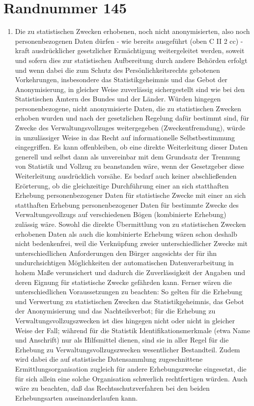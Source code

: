     \section{Randnummer 145}
        \begin{enumerate}[label=\arabic*,start=145]
            \item Die zu statistischen Zwecken erhobenen, noch nicht anonymisierten, also noch personenbezogenen Daten dürfen - wie bereits ausgeführt (oben C II 2 cc) - kraft ausdrücklicher gesetzlicher Ermächtigung weitergeleitet werden, soweit und sofern dies zur statistischen Aufbereitung durch andere Behörden erfolgt und wenn dabei die zum Schutz des Persönlichkeitsrechts gebotenen Vorkehrungen, insbesondere das Statistikgeheimnis und das Gebot der Anonymisierung, in gleicher Weise zuverlässig sichergestellt sind wie bei den Statistischen Ämtern des Bundes und der Länder. Würden hingegen personenbezogene, nicht anonymisierte Daten, die zu statistischen Zwecken erhoben wurden und nach der gesetzlichen Regelung dafür bestimmt sind, für Zwecke des Verwaltungsvollzuges weitergegeben (Zweckentfremdung), würde in unzulässiger Weise in das Recht auf informationelle Selbstbestimmung eingegriffen. Es kann offenbleiben, ob eine direkte Weiterleitung dieser Daten generell und selbst dann als unvereinbar mit dem Grundsatz der Trennung von Statistik und Vollzug zu beanstanden wäre, wenn der Gesetzgeber diese Weiterleitung ausdrücklich vorsähe. Es bedarf auch keiner abschließenden Erörterung, ob die gleichzeitige Durchführung einer an sich statthaften Erhebung personenbezogener Daten für statistische Zwecke mit einer an sich statthaften Erhebung personenbezogener Daten für bestimmte Zwecke des Verwaltungsvollzugs auf verschiedenen Bögen (kombinierte Erhebung) zulässig wäre. Sowohl die direkte Übermittlung von zu statistischen Zwecken erhobenen Daten als auch die kombinierte Erhebung wären schon deshalb nicht bedenkenfrei, weil die Verknüpfung zweier unterschiedlicher Zwecke mit unterschiedlichen Anforderungen den Bürger angesichts der für ihn undurchsichtigen Möglichkeiten der automatischen Datenverarbeitung in hohem Maße verunsichert und dadurch die Zuverlässigkeit der Angaben und deren Eignung für statistische Zwecke gefährden kann. Ferner wären die unterschiedlichen Voraussetzungen zu beachten: So gelten für die Erhebung und Verwertung zu statistischen Zwecken das Statistikgeheimnis, das Gebot der Anonymisierung und das Nachteilsverbot; für die Erhebung zu Verwaltungsvollzugszwecken ist dies hingegen nicht oder nicht in gleicher Weise der Fall; während für die Statistik Identifikationsmerkmale (etwa Name und Anschrift) nur als Hilfsmittel dienen, sind sie in aller Regel für die Erhebung zu Verwaltungsvollzugszwecken wesentlicher Bestandteil. Zudem wird dabei die auf statistische Datensammlung zugeschnittene Ermittlungsorganisation zugleich für andere Erhebungszwecke eingesetzt, die für sich allein eine solche Organisation schwerlich rechtfertigen würden. Auch wäre zu beachten, daß das Rechtsschutzverfahren bei den beiden Erhebungsarten auseinanderlaufen kann.
        \end{enumerate}


















        
